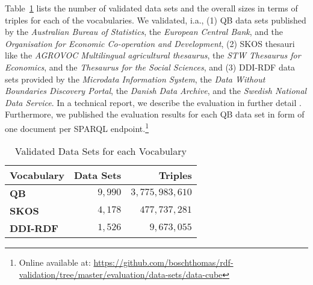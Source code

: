 \documentclass[conference]{IEEEtran}
\newcommand{\ke}[1]{\todo[size=\small, color=red!40]{\textbf{Kai:} #1}}
\begin{document}



Table~\ref{tab:datasets} lists the number of validated data sets and the overall sizes in terms of triples for each of the vocabularies. We validated, i.a., 
(1) QB data sets published by the \emph{Australian Bureau of Statistics},
the \emph{European Central Bank}, and the
\emph{Organisation for Economic Co-operation and Development},
(2) SKOS thesauri like the \emph{AGROVOC Multilingual agricultural thesaurus},
the \emph{STW Thesaurus for Economics}, and the
\emph{Thesaurus for the Social Sciences}, and
(3) DDI-RDF data sets provided by the \emph{Microdata Information System}, 
the \emph{Data Without Boundaries Discovery Portal}, the
\emph{Danish Data Archive}, and the
\emph{Swedish National Data Service}.
In a technical report, we describe the evaluation in further detail \cite{BoschZapilkoWackerowEckert2015-2}. Furthermore, we published the evaluation results for each QB data set in form of one document per SPARQL endpoint.\footnote{Online available at: \url{https://github.com/boschthomas/rdf-validation/tree/master/evaluation/data-sets/data-cube}}

\begin{table}[H]
		\scriptsize
    \begin{center}
		\caption{Validated Data Sets for each Vocabulary}
		\label{tab:datasets}
    \begin{tabular}{lrr}
           \textbf{Vocabulary}
           & \textbf{Data Sets}
           & \textbf{Triples}
					 
    \\ \midrule
		\textbf{QB} & $9,990$   & $3,775,983,610$  \\
		\textbf{SKOS} & $4,178$  & $477,737,281$ \\
		\textbf{DDI-RDF} & $1,526$  & $9,673,055$  \\
    \bottomrule
    \end{tabular}
    \end{center}
\end{table}
\end{document}
